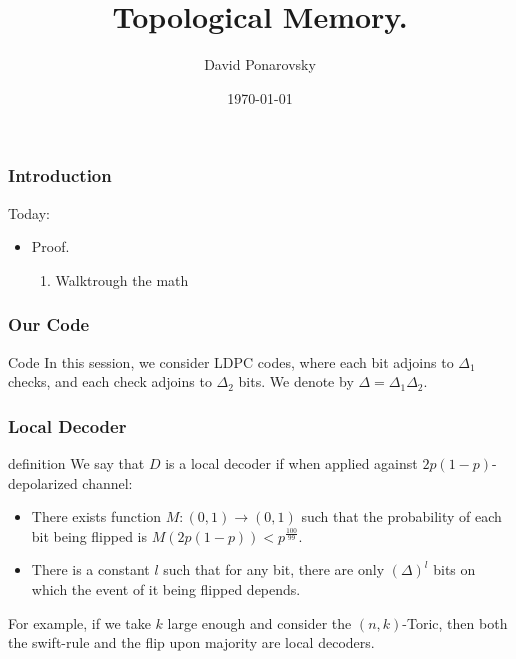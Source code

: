 \documentclass{beamer}
\begin{document}
 



\begin{frame}
  \title{Topological Memory.}
    \author{David Ponarovsky}
    \date{\today}
    \titlepage
\end{frame}


\begin{frame}

\frametitle{Introduction}
\begin{block}{Today:}
\begin{itemize}
  \item Proof. 
    \begin{enumerate}
      \item Walktrough the math 
    \end{enumerate}
\end{itemize}
\end{block}
\end{frame}

  
\begin{frame}
  \frametitle{Our Code}

  \begin{block}{Code}
    In this session, we consider LDPC codes, where each bit adjoins to $\Delta_{1}$ checks, and each check adjoins to $\Delta_{2}$ bits. We denote by $\Delta = \Delta_{1}\Delta_{2}$.
  \end{block}


\end{frame}

\begin{frame}
  \frametitle{Local Decoder} 
  
  \begin{block}{definition}
    We say that $D$ is a local decoder if when applied against $2p(1-p)$-depolarized channel: 
    \begin{itemize}
      \item  There exists function $M : (0,1) \rightarrow (0,1) $ such that the probability of each bit being flipped is $M(2p(1-p)) < p^{\frac{100}{99}}$.
      \item There is a constant $l$ such that for any bit, there are only $(\Delta)^{l}$ bits on which the event of it being flipped depends.
    \end{itemize}
For example, if we take $k$ large enough and consider the $(n,k)$-Toric, then both the swift-rule and the flip upon majority are local decoders.
  \end{block}
\end{frame}
\end{document}

